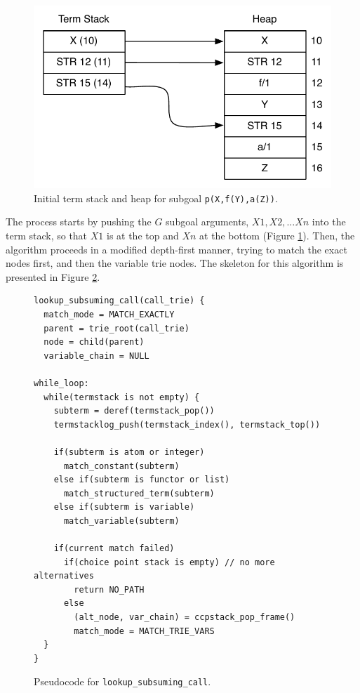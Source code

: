 \begin{figure}[ht]
  \centering
    \includegraphics[scale=0.6]{lookup_subgoal_termstack_start.pdf}
  \caption{Initial term stack and heap for subgoal \texttt{p(X,f(Y),a(Z))}.}
  \label{fig:lookup_subgoal_termstack_start}
\end{figure}

The process starts by pushing the $G$ subgoal arguments, $X1, X2, ...Xn$ into the term stack, so that $X1$ is at the top
and $Xn$ at the bottom (Figure \ref{fig:lookup_subgoal_termstack_start}).
Then, the algorithm proceeds in a modified depth-first manner, trying to match the exact nodes first, and then
the variable trie nodes. The skeleton for this algorithm is presented in Figure \ref{fig:lookup_subsuming_call}.

\begin{figure}[ht]
\begin{Verbatim}[fontsize=\small]
lookup_subsuming_call(call_trie) {
  match_mode = MATCH_EXACTLY
  parent = trie_root(call_trie)
  node = child(parent)
  variable_chain = NULL

while_loop:
  while(termstack is not empty) {
    subterm = deref(termstack_pop())
    termstacklog_push(termstack_index(), termstack_top())
  
    if(subterm is atom or integer)
      match_constant(subterm)
    else if(subterm is functor or list)
      match_structured_term(subterm)
    else if(subterm is variable)
      match_variable(subterm)
  
    if(current match failed)
      if(choice point stack is empty) // no more alternatives
        return NO_PATH
      else
        (alt_node, var_chain) = ccpstack_pop_frame()
        match_mode = MATCH_TRIE_VARS
  }
}
\end{Verbatim}
\caption{Pseudo\-code for \texttt{lookup\_subsuming\_call}.}
\label{fig:lookup_subsuming_call}
\end{figure}

